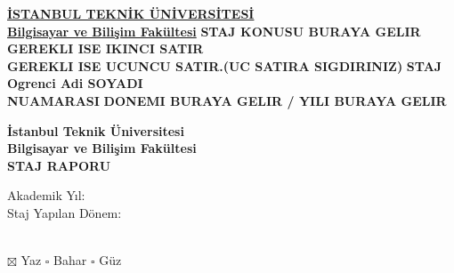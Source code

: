 \documentclass[12pt]{article}
\newcommand{\isim}{Ogrenci Adi SOYADI}
\newcommand{\id}{NUAMARASI}
\begin{document}


\begin{titlepage}
  \centering
  \underline{\bfseries İSTANBUL TEKNİK ÜNİVERSİTESİ} \\
  \underline{\bfseries Bilgisayar ve Bilişim Fakültesi}
  \vfill
      {\bfseries STAJ KONUSU BURAYA GELIR} \\
      {\bfseries GEREKLI ISE IKINCI SATIR} \\
      {\bfseries GEREKLI ISE UCUNCU SATIR.(UC SATIRA SIGDIRINIZ)}
      \vfill
          {\Large\bfseries STAJ} \\
          {\bfseries \isim} \\
          {\bfseries \id}
      \vfill
  {\bfseries DONEMI BURAYA GELIR / YILI BURAYA GELIR}
  
\end{titlepage}

{\centering
{\bfseries İstanbul Teknik Üniversitesi} \\
{\bfseries Bilgisayar ve Bilişim Fakültesi} \\
{\bfseries STAJ RAPORU} \\[1\baselineskip] \par}
\begin{minipage}[t]{.3\textwidth}
  \begin{flushright}
    Akademik Yıl: \\
    Staj Yapılan Dönem:
  \end{flushright}
\end{minipage}%
\hspace{0.5cm}
\begin{minipage}[t]{.7\textwidth}
  \the\year\\
 $\boxtimes$ Yaz  $\square$ Bahar  $\square$ Güz \\ 
\end{minipage}
\end{document}
